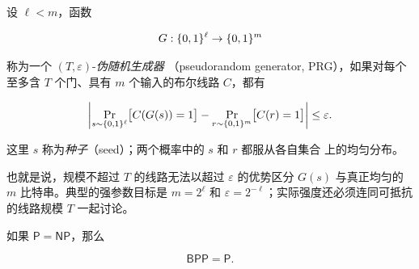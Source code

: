 \begin{definition}[伪随机生成器]
  \label{def:pseudorandom-generator}
  设 $\ell<m$，函数

  \[
    G:\{0,1\}^\ell\to\{0,1\}^m
  \]

  称为一个 $(T,\varepsilon)$-\emph{伪随机生成器}
  （pseudorandom generator, PRG），如果对每个至多含 $T$ 个门、具有 $m$
  个输入的布尔线路 $C$，都有

  \[
    \left|
      \Pr_{s\sim\{0,1\}^\ell}\bigl[C(G(s))=1\bigr]
      -\Pr_{r\sim\{0,1\}^m}\bigl[C(r)=1\bigr]
    \right|
    \leq\varepsilon.
  \]

  这里 $s$ 称为\emph{种子}（seed）；两个概率中的 $s$ 和 $r$ 都服从各自集合
  上的均匀分布。
\end{definition}

也就是说，规模不超过 $T$ 的线路无法以超过 $\varepsilon$ 的优势区分
$G(s)$ 与真正均匀的 $m$ 比特串。典型的强参数目标是
$m=2^\ell$ 和 $\varepsilon=2^{-\ell}$；实际强度还必须连同可抵抗的线路规模
$T$ 一起讨论。

\begin{lemma}
  \label{lem:p-equals-np-implies-bpp-equals-p}
  如果 $\mathsf P=\mathsf{NP}$，那么

  \[
    \mathsf{BPP}=\mathsf P.
  \]
\end{lemma}
